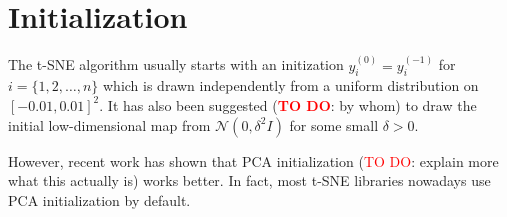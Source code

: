 \section{Initialization}
The t-SNE algorithm usually starts with an initization $y_i^{(0)} = y_i^{(-1)}$ for $i=\{1, 2, \dots, n\}$ which is drawn independently from a uniform distribution on $[-0.01, 0.01]^2$. It has also been suggested (\textcolor{red}{\textbf{TO DO}}: by whom) to draw the initial low-dimensional map from $\mathcal{N}(0, \delta^2 I)$ for some small $\delta > 0$. 

However, recent work \cite{kobak21} has shown that PCA initialization (\textcolor{red}{TO DO}: explain more what this actually is) works better. In fact, most t-SNE libraries nowadays use PCA initialization by default. 